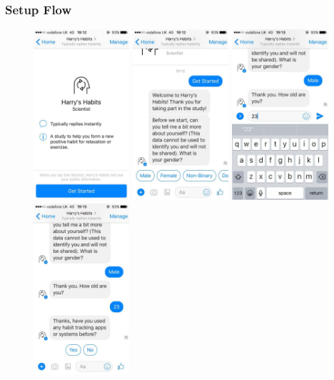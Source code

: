 \subsubsection{Setup Flow} \label{setup_flow}

\begin{figure}[H]
  \centering
  \includegraphics[width=1.4in]{resources/design/process/1.jpg}
  \hspace{10px}
  \includegraphics[width=1.4in]{resources/design/process/2.jpg}
  \hspace{10px}
  \includegraphics[width=1.4in]{resources/design/process/3.jpg}
  \hspace{10px}
  \includegraphics[width=1.4in]{resources/design/process/4.jpg}

\end{figure}
